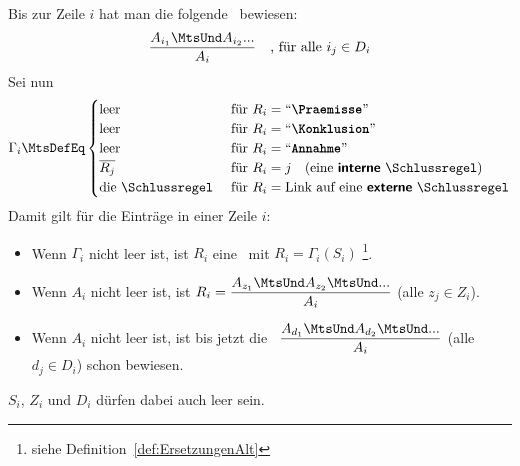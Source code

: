 Bis zur Zeile $i$ hat man die folgende \Schlussregel\ bewiesen:
\[ \frac{A_{i_1} \MtsUnd A_{i_2} ...}{A_i} \quad \text{, für alle } i_j \in D_i \]
Sei nun
\[
	\Gamma_i \MtsDefEq
	\begin{cases}
		\text{leer}    & \text{ für } R_i = \text{\strqt{\Praemisse}} \\
		\text{leer}    & \text{ für } R_i = \text{\strqt{\Konklusion}}     \\
		\text{leer}    & \text{ für } R_i = \text{\strqt{Annahme}}        \\
		\overline{R_j} & \text{ für } R_i = j \quad \text{(eine \DefFt{interne} \Schlussregel)} \\
		\text{die \Schlussregel} & \text{ für } R_i = \text{Link auf eine \DefFt{externe} \Schlussregel}
	\end{cases}
\]
Damit gilt für die Einträge in einer Zeile $i$:
\begin{itemize}
	\item Wenn $\Gamma_i$ nicht leer ist, ist $R_i$ eine \Schlussregel\ mit $R_i = \Gamma_i(S_i)$%
	\footnote{%
		siehe Definition~\eqref{def:ErsetzungenAlt} 
	}.
	\item Wenn $A_i$ nicht leer ist, ist $R_i = \dfrac{A_{z_1} \MtsUnd A_{z_2} \MtsUnd ...}{A_i}$ (alle $z_j \in Z_i$).
	\item Wenn $A_i$ nicht leer ist, ist bis jetzt die \Schlussregel\ $\dfrac{A_{d_1} \MtsUnd A_{d_2} \MtsUnd ...}{A_i}$ (alle $d_j \in D_i$) schon bewiesen.
\end{itemize}
$S_i$, $Z_i$ und $D_i$ dürfen dabei auch leer sein.

